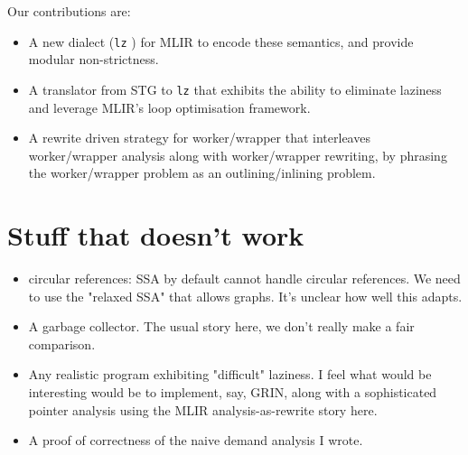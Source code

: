 \documentclass[sigplan,\review anonymous]{acmart}
\newcommand{\lz}{\texttt{lz} }
\begin{document}
                                                                   
Our contributions are:                                          
\begin{itemize}
\item A new dialect (\lz) for MLIR to encode these semantics, and provide modular
      non-strictness.
\item A translator from STG to \lz that exhibits the ability to 
      eliminate laziness and leverage MLIR's loop optimisation  framework.
\item A rewrite driven strategy for worker/wrapper that interleaves 
     worker/wrapper analysis along with worker/wrapper rewriting, by phrasing
     the worker/wrapper problem as an outlining/inlining problem.
\end{itemize}

\section{Stuff that doesn't work}
\begin{itemize}
\item circular references: SSA by default cannot handle circular references.
      We need to use the "relaxed SSA" that allows graphs. It's unclear how well
      this adapts.
\item A garbage collector. The usual story here, we don't really make a fair
      comparison.
\item Any realistic program exhibiting "difficult" laziness. I feel what would
      be interesting would be to implement, say, GRIN, along with a sophisticated
      pointer analysis using the MLIR analysis-as-rewrite story here.
\item A proof of correctness of the naive demand analysis I wrote.
\end{itemize}
\end{document}
